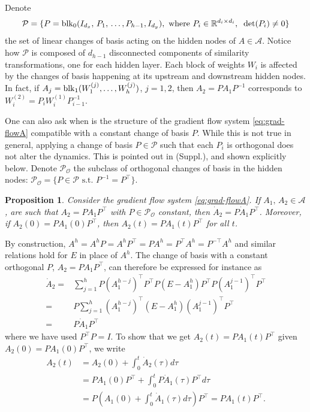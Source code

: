 \documentclass{article}
\makeatletter
\renewenvironment{proof}[1][\proofname]{
  \par\pushQED{\qed}\normalfont
  \topsep6\p@\@plus6\p@\relax
  \trivlist\item[\hskip\labelsep\bfseries#1\@addpunct{.}]
  \ignorespaces
}{
  \popQED\endtrivlist\@endpefalse
}
\newtheorem{proposition}{Proposition}
\def\block{{\rm blk}}
\newcommand{\1}{\mathds{1}}
\makeatother
\begin{document}
Denote
\[
\mathcal{P} = \{ P =\block_0 (I_{d_x},\, P_1, \, \ldots , P_{h-1} , I_{d_y}),  \text{  where  } P_i \in \mathbb{R}^{d_i \times d_i } , \;\; \det ( P_i)\neq 0 \}
\]
the set of linear changes of basis acting on the hidden nodes of $ A \in \mathcal{A}$.
Notice how $ \mathcal{P} $ is composed of $ d_{h-1}$ disconnected components of similarity transformations, one for each hidden layer.
Each block of weights $ W_i $ is affected by the changes of basis happening at its upstream and downstream hidden nodes. In fact, if $ A_j =\block_1( W_1^{(j)}, \ldots , W_h^{(j)})$, $ j=1,2$, then $ A_2 = P A_1 P^{-1} $ corresponds to $ W_i^{(2)}= P_i W_i^{(1)} P_{i-1}^{-1}$. 


One can also ask when is the structure of the gradient flow system \eqref{eq:grad-flowA} compatible with a constant change of basis $P$. 
While this is not true in general, applying a change of basis $P \in \mathcal{P}$ such that each $ P_i $ is orthogonal does not alter the dynamics.
This is pointed out in \cite{saxe2019mathematical} (Suppl.), and shown explicitly below.
Denote $ \mathcal{P_O}  $ the subclass of orthogonal changes of basis in the hidden nodes: $ \mathcal{P_O} = \{ P \in \mathcal{P} \text{ s.t. }  P^{-1} = P^\top  \} $.


\begin{proposition}
\label{prop:constants-equival}
Consider the gradient flow system \eqref{eq:grad-flowA}. 
If $ A_1, \, A_2 \in \mathcal{A}$, are such that $ A_2 = P A_1 P^\top $ with $P\in \mathcal{P_O} $ constant, then $ \dot A_2 = P  \dot{ A }_1 P^\top $. Moreover, if $ A_2(0) = P A_1(0) P^\top $, then $ A_2(t) = P A_1(t) P^\top $ for all $t$.
\end{proposition}

\begin{proof}
    By construction, $ A^h= A^h P = A^h P^\top = P A^h = P^\top A^h = P^{-\top} A^h $ and similar relations hold for $E$ in place of $A^h$.
The change of basis with a constant orthogonal $P$, $ A_2 = P A_1 P^\top $, can therefore be expressed for instance as 
\begin{align*}
\dot A_2 = & \sum_{j=1}^h  P \left(A_1^{h-j}\right)^\top  P^{\top} P  \left( E - A_1^h \right) P^\top  P \left( A_1^{j-1} \right)^\top P^\top \\
= &  P  \sum_{j=1}^h \left(A_1^{h-j}\right)^\top \left( E - A_1^h \right)  \left( A_1^{j-1} \right)^\top P^\top \\
= &  P  \dot{ A }_1 P^\top
\end{align*}
where we have used $ P^\top P = I $.
To show that we get $ A_2(t) = P A_1(t) P^\top $ given $ A_2(0) = P A_1(0) P^\top $, we write
\begin{align*}
    A_2(t) & = A_2(0) + \int_0^t \dot{ A }_2(\tau) d\tau \\
    & = P A_1(0) P^\top + \int_0^t P  \dot{ A }_1( \tau ) P^\top d\tau \\
    & = P \left( A_1(0) + \int_0^t \dot{ A }_1(\tau) d\tau \right) P^\top = P A_1(t) P^\top .
\end{align*}
\end{proof}
\end{document}

